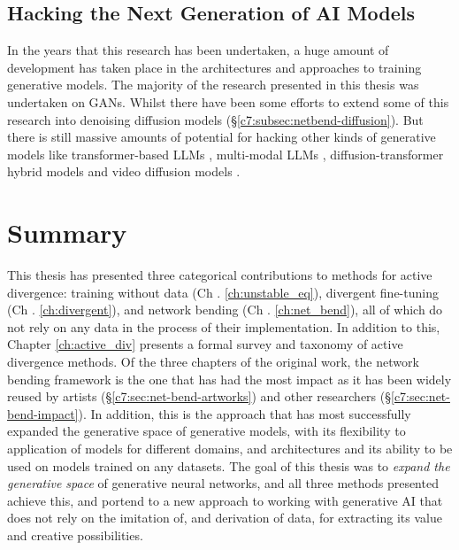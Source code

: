 \subsection{Hacking the Next Generation of AI Models}

In the years that this research has been undertaken, a huge amount of development has taken place in the architectures and approaches to training generative models.
The majority of the research presented in this thesis was undertaken on GANs.
Whilst there have been some efforts to extend some of this research into denoising diffusion models \citep{dzwonczyk2024network} (\S \ref{c7:subsec:netbend-diffusion}). 
But there is still massive amounts of potential for hacking other kinds of generative models like transformer-based LLMs \citep{vaswani2017attention}, multi-modal LLMs \citep{zhang2024mm}, diffusion-transformer hybrid models \citep{peebles2023scalable} and video diffusion models \citep{ho2022video}.

\section{Summary}

This thesis has presented three categorical contributions to methods for active divergence: training without data (Ch . \ref{ch:unstable_eq}), divergent fine-tuning  (Ch . \ref{ch:divergent}), and network bending  (Ch . \ref{ch:net_bend}), all of which do not rely on any data in the process of their implementation. 
In addition to this, Chapter \ref{ch:active_div} presents a formal survey and taxonomy of active divergence methods.
Of the three chapters of the original work, the network bending framework is the one that has had the most impact as it has been widely reused by artists  (\S \ref{c7:sec:net-bend-artworks}) and other researchers  (\S \ref{c7:sec:net-bend-impact}). 
In addition, this is the approach that has most successfully expanded the generative space of generative models, with its flexibility to application of models for different domains, and architectures and its ability to be used on models trained on any datasets.
The goal of this thesis was to \textit{expand the generative space} of generative neural networks, and all three methods presented achieve this, and portend to a new approach to working with generative AI that does not rely on the imitation of, and derivation of data, for extracting its value and creative possibilities.
